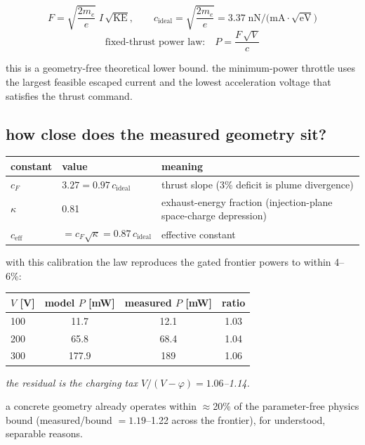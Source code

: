 \documentclass[11pt]{article}
\begin{document}
\[
F = \sqrt{\frac{2m_e}{e}}\; I\,\sqrt{\mathrm{KE}},
\qquad c_{\mathrm{ideal}} = \sqrt{\frac{2m_e}{e}}
  = 3.37\;\text{nN/(mA}\cdot\sqrt{\text{eV}}\text{)}
\]
\[
\text{fixed-thrust power law:}\quad
P = \frac{F\,\sqrt{V}}{c}
\]

this is a geometry-free theoretical lower bound.  the minimum-power throttle
uses the largest feasible escaped current and the lowest acceleration voltage
that satisfies the thrust command.

\subsection{how close does the measured geometry sit?}

\begin{center}\small
\begin{tabular}{lll}
\toprule
constant & value & meaning \\
\midrule
$c_F$ & $3.27 = 0.97\,c_{\mathrm{ideal}}$ & thrust slope (3\% deficit is
  plume divergence) \\
$\kappa$ & 0.81 & exhaust-energy fraction (injection-plane space-charge
  depression) \\
$c_{\mathrm{eff}}$ & $= c_F\sqrt{\kappa} = 0.87\,c_{\mathrm{ideal}}$ &
  effective constant \\
\bottomrule
\end{tabular}
\end{center}

with this calibration the law reproduces the gated frontier powers to within
4--6\%:

\begin{center}\small
\begin{tabular}{lccc}
\toprule
$V$ [V] & model $P$ [mW] & measured $P$ [mW] & ratio \\
\midrule
100 & 11.7  & 12.1 & 1.03 \\
200 & 65.8  & 68.4 & 1.04 \\
300 & 177.9 & 189  & 1.06 \\
\bottomrule
\end{tabular}
\end{center}
{\small\itshape the residual is the charging tax $V/(V-\varphi) = 1.06$--1.14.}

\medskip
a concrete geometry already operates within $\approx$20\% of the
parameter-free physics bound (measured/bound $= 1.19$--1.22 across the
frontier), for understood, separable reasons.

\end{document}
